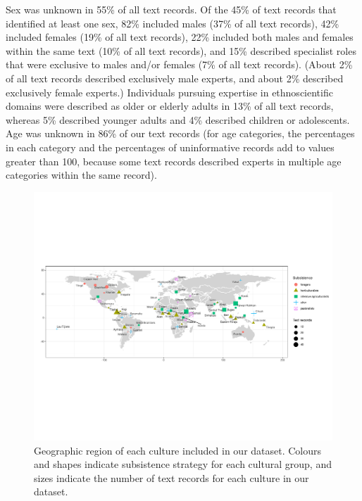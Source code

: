 \documentclass[
  11pt,
]{article}
\begin{document}
Sex was unknown in 55\% of all text records. Of the 45\% of text records that identified at least one sex, 82\% included males (37\% of all text records), 42\% included females (19\% of all text records), 22\% included both males and females within the same text (10\% of all text records), and 15\% described specialist roles that were exclusive to males and/or females (7\% of all text records). (About 2\% of all text records described exclusively male experts, and about 2\% described exclusively female experts.) Individuals pursuing expertise in ethnoscientific domains were described as older or elderly adults in 13\% of all text records, whereas 5\% described younger adults and 4\% described children or adolescents. Age was unknown in 86\% of our text records (for age categories, the percentages in each category and the percentages of uninformative records add to values greater than 100, because some text records described experts in multiple age categories within the same record).

\begin{landscape}

\begin{figure}

{\centering \includegraphics{conceptual-experts-paper_files/figure-latex/worldmap-1} 

}

\caption{Geographic region of each culture included in our dataset. Colours and shapes indicate subsistence strategy for each cultural group, and sizes indicate the number of text records for each culture in our dataset.}\label{fig:worldmap}
\end{figure}

\end{landscape}
\end{document}
